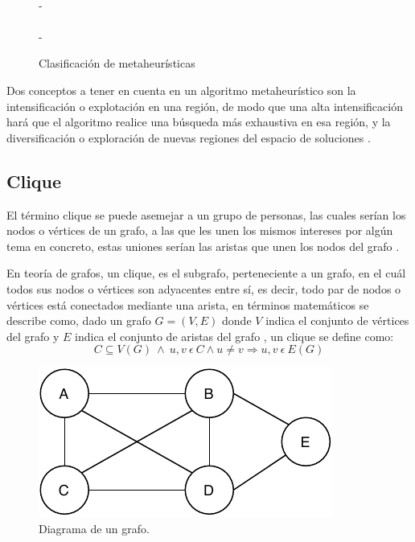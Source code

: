 \begin{figure}[H]
{{{			}\\
			- \\
		}\\
		- \\
	}
	\caption{Clasificación de metaheurísticas}
	\label{fig:clasif-metahs}
\end{figure}

Dos conceptos a tener en cuenta en un algoritmo metaheurístico son la intensificación o explotación en una región, de modo que una alta intensificación hará que el algoritmo realice una búsqueda más exhaustiva en esa región, y la diversificación o exploración de nuevas regiones del espacio de soluciones \cite{libro-metaheuristicas}.

\subsection{Clique}
\label{sec-clique}
El término clique se puede asemejar a un grupo de personas, las cuales serían los nodos o vértices de un grafo, a las que les unen los mismos intereses por algún tema en concreto, estas uniones serían las aristas que unen los nodos del grafo \cite{LUCE:1949}.

En teoría de grafos, un clique, es el subgrafo, perteneciente a un grafo, en el cuál todos sus nodos o vértices son adyacentes entre sí, es decir, todo par de nodos o vértices está conectados mediante una arista, en términos matemáticos se describe como, dado un grafo $G = (V, E)$ donde $V$ indica el conjunto de vértices del grafo y $E$ indica el conjunto de aristas del grafo \cite{web-clique}, un clique se define como:
\[
C \subseteq V(G) ~ \wedge ~ u, v ~ \epsilon ~ C  \wedge  u  \neq v \Rightarrow u, v ~ \epsilon ~ E(G)
\]

\begin{figure}[H]
	\centering
	\includegraphics{Figures/graph.pdf}
	\caption{Diagrama de un grafo.}
	\label{fig:graph}
\end{figure}

